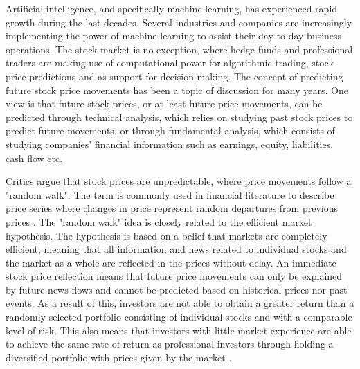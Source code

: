 Artificial intelligence, and specifically machine learning, has experienced rapid growth during the last decades. Several industries and companies are increasingly implementing the power of machine learning to assist their day-to-day business operations. The stock market is no exception, where hedge funds and professional traders are making use of computational power for algorithmic trading, stock price predictions and as support for decision-making. The concept of predicting future stock price movements has been a topic of discussion for many years. One view is that future stock prices, or at least future price movements, can be predicted through technical analysis, which relies on studying past stock prices to predict future movements, or through fundamental analysis, which consists of studying companies' financial information such as earnings, equity, liabilities, cash flow etc. 

\indent \newline 
Critics argue that stock prices are unpredictable, where price movements follow a "random walk". The term is commonly used in financial literature to describe price series where changes in price represent random departures from previous prices \cite{malkiel}. The "random walk" idea is closely related to the efficient market hypothesis. The hypothesis is based on a belief that markets are completely efficient, meaning that all information and news related to individual stocks and the market as a whole are reflected in the prices without delay. An immediate stock price reflection means that future price movements can only be explained by future news flows and cannot be predicted based on historical prices nor past events. As a result of this, investors are not able to obtain a greater return than a randomly selected portfolio consisting of individual stocks and with a comparable level of risk. This also means that investors with little market experience are able to achieve the same rate of return as professional investors through holding a diversified portfolio with prices given by the market \cite{malkiel}.  

